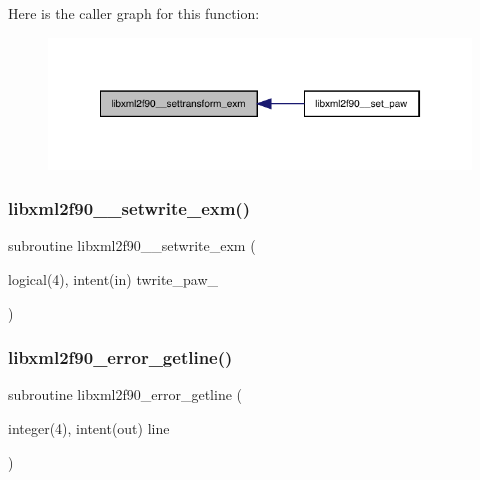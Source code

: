 Here is the caller graph for this function\+:
\nopagebreak
\begin{figure}[H]
\begin{center}
\leavevmode
\includegraphics[width=322pt]{libxml2f90_8f90__pp_8f90_a2a5163c07b4567f5db11625bcdbb7607_icgraph}
\end{center}
\end{figure}
\mbox{\label{libxml2f90_8f90__pp_8f90_aa478c761a45bbb0eafdd081ea6cc0694}} 
\subsubsection{\texorpdfstring{libxml2f90\+\_\+\+\_\+setwrite\+\_\+exm()}{libxml2f90\_\_setwrite\_exm()}}
{\footnotesize\ttfamily subroutine libxml2f90\+\_\+\+\_\+setwrite\+\_\+exm (\begin{DoxyParamCaption}\item[{logical(4), intent(in)}]{twrite\+\_\+paw\+\_\+ }\end{DoxyParamCaption})}

\mbox{\label{libxml2f90_8f90__pp_8f90_ae1a542a061a5705a796b5373b0dcaf1b}} 
\subsubsection{\texorpdfstring{libxml2f90\+\_\+error\+\_\+getline()}{libxml2f90\_error\_getline()}}
{\footnotesize\ttfamily subroutine libxml2f90\+\_\+error\+\_\+getline (\begin{DoxyParamCaption}\item[{integer(4), intent(out)}]{line }\end{DoxyParamCaption})}

